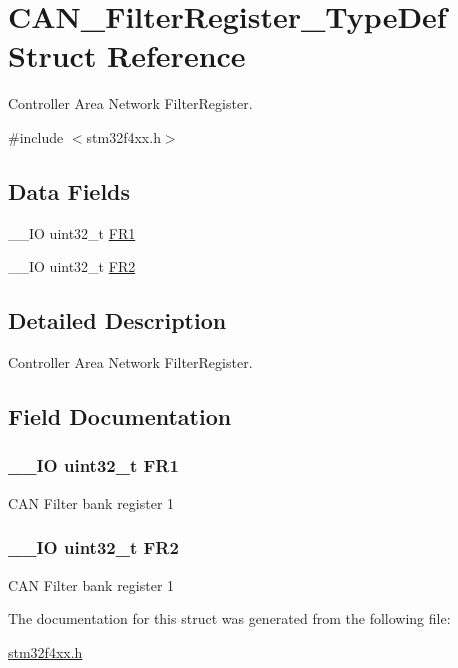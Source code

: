 \hypertarget{struct_c_a_n___filter_register___type_def}{\section{C\-A\-N\-\_\-\-Filter\-Register\-\_\-\-Type\-Def Struct Reference}
\label{struct_c_a_n___filter_register___type_def}
}


Controller Area Network Filter\-Register.  




{\ttfamily \#include $<$stm32f4xx.\-h$>$}

\subsection*{Data Fields}
\begin{DoxyCompactItemize}
\item 
\-\_\-\-\_\-\-I\-O uint32\-\_\-t \hyperlink{struct_c_a_n___filter_register___type_def_a92036953ac673803fe001d843fea508b}{F\-R1}
\item 
\-\_\-\-\_\-\-I\-O uint32\-\_\-t \hyperlink{struct_c_a_n___filter_register___type_def_a7f7d80b45b7574463d7030fc8a464582}{F\-R2}
\end{DoxyCompactItemize}


\subsection{Detailed Description}
Controller Area Network Filter\-Register. 

\subsection{Field Documentation}
\hypertarget{struct_c_a_n___filter_register___type_def_a92036953ac673803fe001d843fea508b}{
\subsubsection[{F\-R1}]{\setlength{\rightskip}{0pt plus 5cm}\-\_\-\-\_\-\-I\-O uint32\-\_\-t F\-R1}}\label{struct_c_a_n___filter_register___type_def_a92036953ac673803fe001d843fea508b}
C\-A\-N Filter bank register 1 \hypertarget{struct_c_a_n___filter_register___type_def_a7f7d80b45b7574463d7030fc8a464582}{
\subsubsection[{F\-R2}]{\setlength{\rightskip}{0pt plus 5cm}\-\_\-\-\_\-\-I\-O uint32\-\_\-t F\-R2}}\label{struct_c_a_n___filter_register___type_def_a7f7d80b45b7574463d7030fc8a464582}
C\-A\-N Filter bank register 1 

The documentation for this struct was generated from the following file\-:\begin{DoxyCompactItemize}
\item 
\hyperlink{stm32f4xx_8h}{stm32f4xx.\-h}\end{DoxyCompactItemize}
